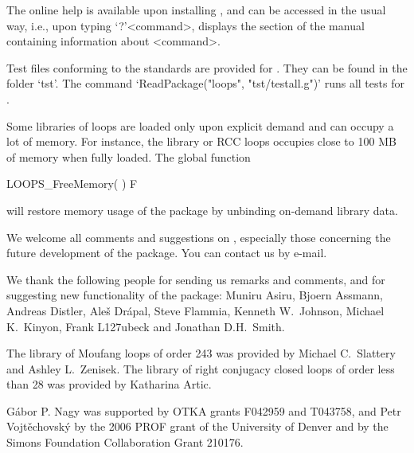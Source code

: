 The online {\GAP} help is available upon installing {\LOOPS}, and can be
accessed in the usual way, i.e., upon typing `?'<command>, {\GAP} displays the
section of the {\LOOPS} manual containing information about <command>.


Test files conforming to the {\GAP} standards are provided for {\LOOPS}. They
can be found in the folder `tst'. The command `ReadPackage("loops",
"tst/testall.g")' runs all tests for {\LOOPS}.


Some libraries of loops are loaded only upon explicit demand and can occupy a lot of memory. For instance, the library or RCC loops occupies close to 100 MB of memory when fully loaded. The global function

\>LOOPS_FreeMemory( ) F

will restore memory usage of the {\LOOPS} package by unbinding on-demand library data.


We welcome all comments and suggestions on {\LOOPS}, especially those
concerning the future development of the package. You can contact us by e-mail.


We thank the following people for sending us remarks and comments, and for suggesting new functionality of the package: Muniru Asiru, Bjoern Assmann, Andreas Distler, Ale\v{s} Dr\'apal, Steve Flammia, Kenneth W.~Johnson, Michael K.~Kinyon, Frank L\accent127ubeck and Jonathan D.H.~Smith.

The library of Moufang loops of order 243 was provided by Michael C.~Slattery and Ashley L.~Zenisek. The library of right conjugacy closed loops of order less than 28 was provided by Katharina Artic.

G\'abor P. Nagy was supported by OTKA grants F042959 and T043758, and Petr Vojt\v{e}chovsk\'y by the 2006 PROF grant of the University of Denver and by the Simons Foundation Collaboration Grant 210176.
